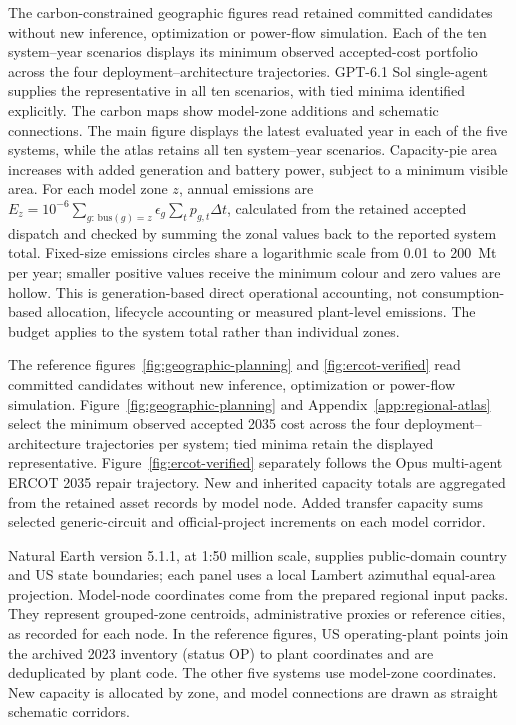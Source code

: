 \documentclass[pdflatex,sn-nature]{sn-jnl}
\begin{document}
The carbon-constrained geographic figures read retained committed candidates without new inference, optimization or power-flow simulation. Each of the ten system--year scenarios displays its minimum observed accepted-cost portfolio across the four deployment--architecture trajectories. GPT-6.1 Sol single-agent supplies the representative in all ten scenarios, with tied minima identified explicitly. The carbon maps show model-zone additions and schematic connections. The main figure displays the latest evaluated year in each of the five systems, while the atlas retains all ten system--year scenarios. Capacity-pie area increases with added generation and battery power, subject to a minimum visible area. For each model zone $z$, annual emissions are $E_z=10^{-6}\sum_{g:\,\mathrm{bus}(g)=z}\epsilon_g\sum_t p_{g,t}\Delta t$, calculated from the retained accepted dispatch and checked by summing the zonal values back to the reported system total. Fixed-size emissions circles share a logarithmic scale from 0.01 to 200~Mt per year; smaller positive values receive the minimum colour and zero values are hollow. This is generation-based direct operational accounting, not consumption-based allocation, lifecycle accounting or measured plant-level emissions. The budget applies to the system total rather than individual zones.

The reference figures~\ref{fig:geographic-planning} and \ref{fig:ercot-verified} read committed candidates without new inference, optimization or power-flow simulation. Figure~\ref{fig:geographic-planning} and Appendix~\ref{app:regional-atlas} select the minimum observed accepted 2035 cost across the four deployment--architecture trajectories per system; tied minima retain the displayed representative. Figure~\ref{fig:ercot-verified} separately follows the Opus multi-agent ERCOT 2035 repair trajectory. New and inherited capacity totals are aggregated from the retained asset records by model node. Added transfer capacity sums selected generic-circuit and official-project increments on each model corridor.

Natural Earth version 5.1.1, at 1:50 million scale, supplies public-domain country and US state boundaries\cite{naturalearth50m}; each panel uses a local Lambert azimuthal equal-area projection. Model-node coordinates come from the prepared regional input packs. They represent grouped-zone centroids, administrative proxies or reference cities, as recorded for each node. In the reference figures, US operating-plant points join the archived 2023 inventory (status OP) to plant coordinates and are deduplicated by plant code. The other five systems use model-zone coordinates. New capacity is allocated by zone, and model connections are drawn as straight schematic corridors.
\end{document}
